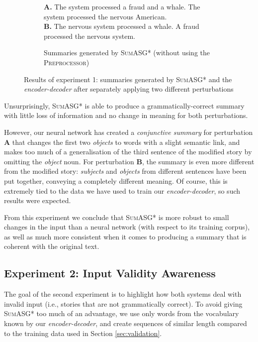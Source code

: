 \begin{figure}[H]
\begin{subfigure}{\textwidth}
\begin{displayquote}
\textbf{A.} The system processed a fraud and a whale. The system processed the nervous American. \\
\textbf{B.} The nervous system processed a whale. A fraud processed the nervous system.
\end{displayquote}
\caption{Summaries generated by \textsc{SumASG*} (without using the \textsc{Preprocessor})}
\end{subfigure}
\caption{Results of experiment 1: summaries generated by \textsc{SumASG*} and the \textit{encoder-decoder} after separately applying two different perturbations}
\label{fig:experiment_1}
\end{figure}

\noindent
Unsurprisingly, \textsc{SumASG*} is able to produce a grammatically-correct summary with little loss of information and no change in meaning for both perturbations.

However, our neural network has created a \textit{conjunctive summary} for perturbation \textbf{A} that changes the first two \textit{objects} to words with a slight semantic link, and makes too much of a generalisation of the third sentence of the modified story by omitting the \textit{object} noun. For perturbation \textbf{B}, the summary is even more different from the modified story: \textit{subjects} and \textit{objects} from different sentences have been put together, conveying a completely different meaning. Of course, this is extremely tied to the data we have used to train our \textit{encoder-decoder}, so such results were expected.

From this experiment we conclude that \textsc{SumASG*} is more robust to small changes in the input than a neural network (with respect to its training corpus), as well as much more consistent when it comes to producing a summary that is coherent with the original text.

\subsection{Experiment 2: Input Validity Awareness}
\label{subsec:experiment_2}

The goal of the second experiment is to highlight how both systems deal with invalid input (i.e., stories that are not grammatically correct). To avoid giving \textsc{SumASG*} too much of an advantage, we use only words from the vocabulary known by our \textit{encoder-decoder}, and create sequences of similar length compared to the training data used in Section \ref{sec:validation}.


